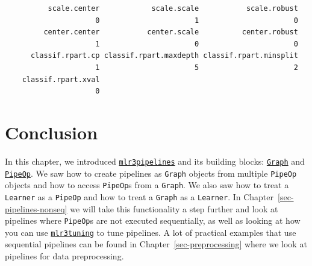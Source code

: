 \begin{verbatim}
          scale.center            scale.scale           scale.robust 
                     0                      1                      0 
         center.center           center.scale          center.robust 
                     1                      0                      0 
      classif.rpart.cp classif.rpart.maxdepth classif.rpart.minsplit 
                     1                      5                      2 
    classif.rpart.xval 
                     0 
\end{verbatim}

\hypertarget{conclusion-5}{%
\section{Conclusion}\label{conclusion-5}}

In this chapter, we introduced
\href{https://mlr3pipelines.mlr-org.com}{\texttt{mlr3pipelines}}
and its building blocks:
\href{https://mlr3pipelines.mlr-org.com/reference/Graph.html}{\texttt{Graph}}
and
\href{https://mlr3pipelines.mlr-org.com/reference/PipeOp.html}{\texttt{PipeOp}}.
We saw how to create pipelines as \texttt{Graph} objects from multiple
\texttt{PipeOp} objects and how to access \texttt{PipeOp}s from a
\texttt{Graph}. We also saw how to treat a \texttt{Learner} as a
\texttt{PipeOp} and how to treat a \texttt{Graph} as a \texttt{Learner}.
In Chapter~\ref{sec-pipelines-nonseq} we will take this functionality a
step further and look at pipelines where \texttt{PipeOp}s are not
executed sequentially, as well as looking at how you can use
\href{https://mlr3tuning.mlr-org.com}{\texttt{mlr3tuning}}
to tune pipelines. A lot of practical examples that use sequential
pipelines can be found in Chapter~\ref{sec-preprocessing} where we look
at pipelines for data preprocessing.

